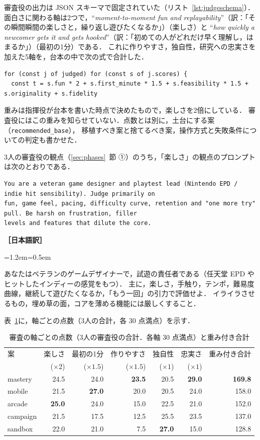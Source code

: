 \documentclass[a4paper,10pt]{ltjsarticle}
\newcommand{\tabref}[1]{表~\ref{#1}}
\newcommand{\secref}[1]{\ref{#1}~節}
\newcommand{\lstref}[1]{リスト~\ref{#1}}
\newcommand{\code}[1]{\texttt{#1}}
\newenvironment{yaku}{\par\vspace{-2pt}\small\noindent\textbf{［日本語訳］}\par\nopagebreak\begin{list}{}{\leftmargin=1.2em\rightmargin=0.5em\topsep=1pt}\item\relax}{\end{list}\vspace{4pt}}
\begin{document}
審査役の出力は JSON スキーマで固定されていた（\lstref{lst:judgeschema}）．
面白さに関わる軸は2つで，``\textit{moment-to-moment fun and replayability}''（訳：「その瞬間瞬間の楽しさと，繰り返し遊びたくなるか」）（楽しさ）と
``\textit{how quickly a newcomer gets it and gets hooked}''（訳：「初めての人がどれだけ早く理解し，はまるか」）（最初の1分）である．
これに作りやすさ，独自性，研究への忠実さを加えた5軸を，台本の中で次の式で合計した．
\begin{lstlisting}[caption={重み付き合計（台本の抜粋）},label={lst:weight}]
for (const j of judged) for (const s of j.scores) {
  const t = s.fun * 2 + s.first_minute * 1.5 + s.feasibility * 1.5 + s.originality + s.fidelity
\end{lstlisting}
重みは指揮役が台本を書いた時点で決めたもので，楽しさを2倍にしている．
審査役にはこの重みを知らせていない．点数とは別に，土台にする案（\code{recommended\_base}），
移植すべき案と捨てるべき案，操作方式と失敗条件についての判定も書かせた．

3人の審査役の観点（\secref{sec:phases} ①）のうち，「楽しさ」の観点のプロンプトは次のとおりである．
\begin{lstlisting}[caption={審査役「楽しさ」の観点（全文）},label={lst:funlens}]
You are a veteran game designer and playtest lead (Nintendo EPD / indie hit sensibility). Judge primarily on
fun, game feel, pacing, difficulty curve, retention and "one more try" pull. Be harsh on frustration, filler
levels and features that dilute the core.
\end{lstlisting}
\begin{yaku}
あなたはベテランのゲームデザイナーで，試遊の責任者である（任天堂 EPD やヒットしたインディーの感覚をもつ）．
主に，楽しさ，手触り，テンポ，難易度曲線，継続して遊びたくなるか，「もう一回」の引力で評価せよ．
イライラさせるもの，埋め草の面，コアを薄める機能には厳しくすること．
\end{yaku}

\tabref{tab:judgeaxes}に，軸ごとの点数（3人の合計，各 30 点満点）を示す．

\begin{table}[H]
\centering
\caption{審査の軸ごとの点数（3人の審査役の合計．各軸 30 点満点）と重み付き合計}
\label{tab:judgeaxes}
\small
\begin{tabular}{lrrrrrr}
\toprule
案 & 楽しさ & 最初の1分 & 作りやすさ & 独自性 & 忠実さ & 重み付き合計 \\
 & ($\times2$) & ($\times1.5$) & ($\times1.5$) & ($\times1$) & ($\times1$) & \\
\midrule
mastery & 24.5 & 24.0 & \textbf{23.5} & 20.5 & \textbf{29.0} & \textbf{169.8} \\
mobile & 21.5 & \textbf{27.0} & 20.0 & 20.5 & 24.0 & 158.0 \\
arcade & \textbf{25.0} & 24.0 & 15.0 & 22.5 & 21.0 & 152.0 \\
campaign & 21.5 & 17.5 & 12.5 & 25.5 & 23.5 & 137.0 \\
sandbox & 22.0 & 21.0 & 7.5 & \textbf{27.0} & 15.0 & 128.8 \\
\bottomrule
\end{tabular}
\end{table}
\end{document}
